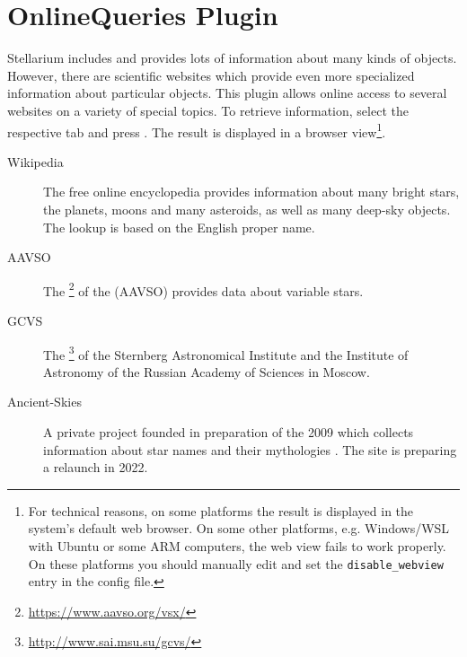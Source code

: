 % 

\newpage
\section{OnlineQueries Plugin}
\label{sec:plugins:OnlineQueries}

Stellarium includes and provides lots of information about many kinds
of objects. However, there are scientific websites which provide even
more specialized information about particular objects. This plugin
 allows online access to several websites on a
variety of special topics. To retrieve information, select the
respective tab and press . The result is displayed in a
browser view\footnote{%
  For technical reasons, on some platforms the
  result is displayed in the system's default web browser.  On some
  other platforms, e.g. Windows/WSL with Ubuntu or some ARM computers, the
  web view fails to work properly.  On these platforms you should
  manually edit  and set the
  \texttt{disable\_webview} entry in the config file.}.

\begin{description}
\item[Wikipedia] The free online encyclopedia provides information
  about many bright stars, the planets, moons and many asteroids, as
  well as many deep-sky objects. The lookup is based on the English
  proper name.
\item[AAVSO] The \footnote{\url{https://www.aavso.org/vsx/}} of the
   (AAVSO)
  provides data about variable stars.
\item[GCVS] The \footnote{\url{http://www.sai.msu.su/gcvs/}} of the Sternberg
  Astronomical Institute and the Institute of Astronomy of the Russian
  Academy of Sciences in Moscow.
\item[Ancient-Skies] A private project founded in preparation of the
   2009 which collects
  information about star names and their mythologies
  \citep{AncientSkies:2011}. The site is preparing a relaunch in 2022.
\end{description}

